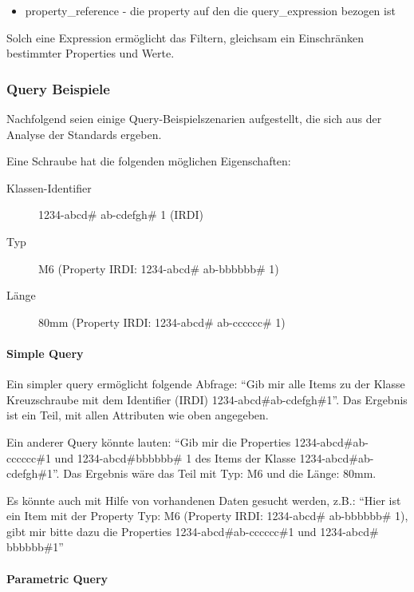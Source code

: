 \begin{itemize}
\item property\_reference - die property auf den die query\_expression bezogen ist
\end{itemize}
Solch eine Expression ermöglicht das Filtern, gleichsam ein Einschränken bestimmter Properties und Werte. 

\subsubsection{Query Beispiele}\label{kap:query_beispiele}

Nachfolgend seien einige Query-Beispielszenarien aufgestellt, die sich aus der Analyse der Standards ergeben.

Eine Schraube hat die folgenden möglichen Eigenschaften: 

\begin{description}
\item[Klassen-Identifier] 1234-abcd\# ab-cdefgh\# 1 (IRDI)
\item[Typ] M6 (Property IRDI: 1234-abcd\# ab-bbbbbb\# 1)
\item[Länge] 80mm (Property IRDI: 1234-abcd\# ab-cccccc\# 1)
\end{description}

\paragraph{Simple Query}

Ein simpler query ermöglicht folgende Abfrage: \enquote{Gib mir alle Items zu der Klasse Kreuzschraube mit dem Identifier (IRDI) 1234-abcd\#ab-cdefgh\#1}. Das Ergebnis ist ein Teil, mit allen Attributen wie oben angegeben. 

Ein anderer Query könnte lauten:  \enquote{Gib mir die Properties 1234-abcd\#ab-cccccc\#1 und 1234-abcd\#bbbbbb\# 1 des Items der Klasse 1234-abcd\#ab-cdefgh\#1}. Das Ergebnis wäre das Teil mit Typ: M6 und die Länge: 80mm.

Es könnte auch mit Hilfe von vorhandenen Daten gesucht werden, z.B.:  \enquote{Hier ist ein Item mit der Property Typ: M6 (Property IRDI: 1234-abcd\# ab-bbbbbb\# 1), gibt mir bitte dazu die Properties 1234-abcd\#ab-cccccc\#1 und 1234-abcd\# bbbbbb\#1} 

\paragraph{Parametric Query}

